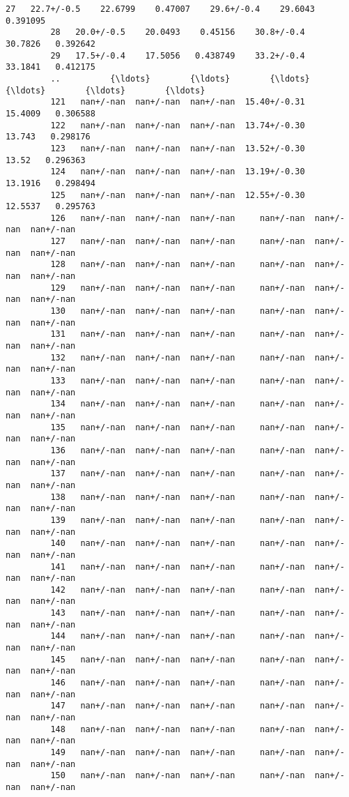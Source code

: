 \documentclass[11pt]{article}
\begin{document}
\begin{Verbatim}[commandchars=\\\{\}]
         27   22.7+/-0.5    22.6799    0.47007    29.6+/-0.4    29.6043   0.391095   
         28   20.0+/-0.5    20.0493    0.45156    30.8+/-0.4    30.7826   0.392642   
         29   17.5+/-0.4    17.5056   0.438749    33.2+/-0.4    33.1841   0.412175   
         ..          {\ldots}        {\ldots}        {\ldots}           {\ldots}        {\ldots}        {\ldots}   
         121   nan+/-nan  nan+/-nan  nan+/-nan  15.40+/-0.31    15.4009   0.306588   
         122   nan+/-nan  nan+/-nan  nan+/-nan  13.74+/-0.30     13.743   0.298176   
         123   nan+/-nan  nan+/-nan  nan+/-nan  13.52+/-0.30      13.52   0.296363   
         124   nan+/-nan  nan+/-nan  nan+/-nan  13.19+/-0.30    13.1916   0.298494   
         125   nan+/-nan  nan+/-nan  nan+/-nan  12.55+/-0.30    12.5537   0.295763   
         126   nan+/-nan  nan+/-nan  nan+/-nan     nan+/-nan  nan+/-nan  nan+/-nan   
         127   nan+/-nan  nan+/-nan  nan+/-nan     nan+/-nan  nan+/-nan  nan+/-nan   
         128   nan+/-nan  nan+/-nan  nan+/-nan     nan+/-nan  nan+/-nan  nan+/-nan   
         129   nan+/-nan  nan+/-nan  nan+/-nan     nan+/-nan  nan+/-nan  nan+/-nan   
         130   nan+/-nan  nan+/-nan  nan+/-nan     nan+/-nan  nan+/-nan  nan+/-nan   
         131   nan+/-nan  nan+/-nan  nan+/-nan     nan+/-nan  nan+/-nan  nan+/-nan   
         132   nan+/-nan  nan+/-nan  nan+/-nan     nan+/-nan  nan+/-nan  nan+/-nan   
         133   nan+/-nan  nan+/-nan  nan+/-nan     nan+/-nan  nan+/-nan  nan+/-nan   
         134   nan+/-nan  nan+/-nan  nan+/-nan     nan+/-nan  nan+/-nan  nan+/-nan   
         135   nan+/-nan  nan+/-nan  nan+/-nan     nan+/-nan  nan+/-nan  nan+/-nan   
         136   nan+/-nan  nan+/-nan  nan+/-nan     nan+/-nan  nan+/-nan  nan+/-nan   
         137   nan+/-nan  nan+/-nan  nan+/-nan     nan+/-nan  nan+/-nan  nan+/-nan   
         138   nan+/-nan  nan+/-nan  nan+/-nan     nan+/-nan  nan+/-nan  nan+/-nan   
         139   nan+/-nan  nan+/-nan  nan+/-nan     nan+/-nan  nan+/-nan  nan+/-nan   
         140   nan+/-nan  nan+/-nan  nan+/-nan     nan+/-nan  nan+/-nan  nan+/-nan   
         141   nan+/-nan  nan+/-nan  nan+/-nan     nan+/-nan  nan+/-nan  nan+/-nan   
         142   nan+/-nan  nan+/-nan  nan+/-nan     nan+/-nan  nan+/-nan  nan+/-nan   
         143   nan+/-nan  nan+/-nan  nan+/-nan     nan+/-nan  nan+/-nan  nan+/-nan   
         144   nan+/-nan  nan+/-nan  nan+/-nan     nan+/-nan  nan+/-nan  nan+/-nan   
         145   nan+/-nan  nan+/-nan  nan+/-nan     nan+/-nan  nan+/-nan  nan+/-nan   
         146   nan+/-nan  nan+/-nan  nan+/-nan     nan+/-nan  nan+/-nan  nan+/-nan   
         147   nan+/-nan  nan+/-nan  nan+/-nan     nan+/-nan  nan+/-nan  nan+/-nan   
         148   nan+/-nan  nan+/-nan  nan+/-nan     nan+/-nan  nan+/-nan  nan+/-nan   
         149   nan+/-nan  nan+/-nan  nan+/-nan     nan+/-nan  nan+/-nan  nan+/-nan   
         150   nan+/-nan  nan+/-nan  nan+/-nan     nan+/-nan  nan+/-nan  nan+/-nan   
         

\end{Verbatim}
\end{document}
